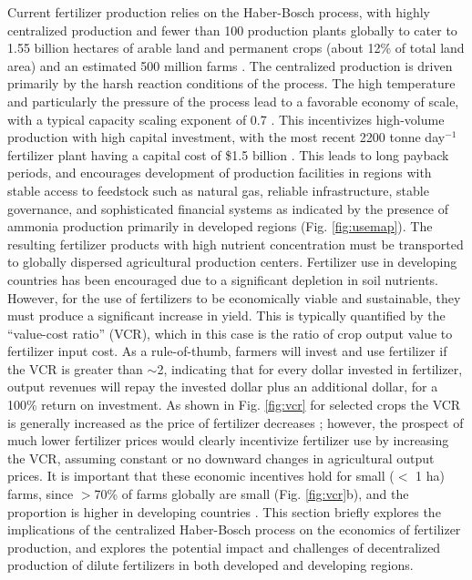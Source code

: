 Current fertilizer production relies on the Haber-Bosch process, with highly centralized production and fewer than 100 production plants \cite{McArthur_2017} globally to cater to 1.55 billion hectares of arable land and permanent crops (about 12\% of total land area) \cite{FAOSTAT_2018} and an estimated 500 million farms \cite{FAO_2014,Lowder_2016}. The centralized production is driven primarily by the harsh reaction conditions of the process. The high temperature and particularly the pressure of the process lead to a favorable economy of scale, with a typical capacity scaling exponent of 0.7 \cite{Ullmann_amm_2006, Berthouex_1972}. This incentivizes high-volume production with high capital investment, with the most recent 2200 tonne day$^{-1}$ fertilizer plant having a capital cost of \$1.5 billion \cite{northern_plains_2013}. This leads to long payback periods, and encourages development of production facilities in regions with stable access to feedstock such as natural gas, reliable infrastructure, stable governance, and sophisticated financial systems \cite{McArthur_2017} as indicated by the presence of ammonia production primarily in developed regions (Fig. \ref{fig:usemap}). The resulting fertilizer products with high nutrient concentration must be transported to globally dispersed agricultural production centers. Fertilizer use in developing countries has been encouraged due to a significant depletion in soil nutrients. However, for the use of fertilizers to be economically viable and sustainable, they must produce a significant increase in yield. This is typically quantified by the ``value-cost ratio'' (VCR), which in this case is the ratio of crop output value to fertilizer input cost. As a rule-of-thumb, farmers will invest and use fertilizer if the VCR is greater than $\sim$2, indicating that for every dollar invested in fertilizer, output revenues will repay the invested dollar plus an additional dollar, for a 100\% return on investment. As shown in Fig. \ref{fig:vcr} for selected crops the VCR is generally increased as the price of fertilizer decreases \cite{sommer_2013}; however, the prospect of much lower fertilizer prices would clearly incentivize fertilizer use by increasing the VCR, assuming constant or no downward changes in agricultural output prices. It is important that these economic incentives hold for small ($<$ 1 ha) farms, since $>$70\% of farms globally are small (Fig. \ref{fig:vcr}b), and the proportion is higher in developing countries \cite{Lowder_2016}. This section briefly explores the implications of the centralized Haber-Bosch process on the economics of fertilizer production, and explores the potential impact and challenges of decentralized production of dilute fertilizers in both developed and developing regions.
